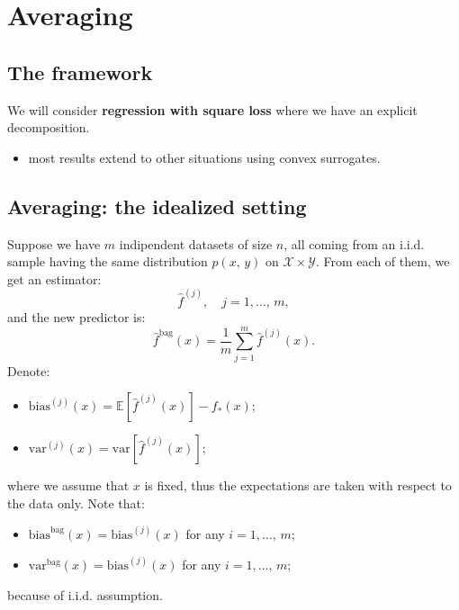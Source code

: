 \documentclass[
11pt,notheorems,hyperref={pdfauthor=whatever}
]{beamer}
\begin{document}
\section{Averaging}
\subsection{The framework}
\begin{frame}
    We will consider \alert{\textbf{regression with square loss}} where we have an explicit  decomposition.
    \begin{itemize}
        \item most results extend to other situations using convex surrogates.
    \end{itemize}
\end{frame}

\subsection{Averaging: the idealized setting}
\begin{frame}
    Suppose we have \(m\) indipendent datasets of size \(n\), all coming from an i.i.d. sample having the same distribution \(p(x,\,y)\) on \(\mathcal{X}\times\mathcal{Y}\). From each of them, we get an estimator:
    \[
        \hat{f}^{(j)},\quad j=1,\dots,\,m,
    \]
    and the new predictor is:
    \[
        \hat{f}^{\text{bag}}(x) = \frac{1}{m} \sum_{j=1}^m \hat{f}^{(j)}(x).
    \]
    Denote:
    \begin{itemize}
        \item \(\text{bias}^{(j)}(x)=\mathbb{E}\left[\hat{f}^{(j)}(x)\right]-f_*(x)\);
        \item \(\text{var}^{(j)}(x)=\text{var}\left[\hat{f}^{(j)}(x)\right]\);
    \end{itemize}
    where we assume that \(x\) is fixed, thus the expectations are taken with respect to the data only. Note that:
    \begin{itemize}
        \item \(\text{bias}^{\text{bag}}(x)=\text{bias}^{(j)}(x)\) for any \(i=1,\dots,\,m\);
        \item \(\text{var}^{\text{bag}}(x)=\text{bias}^{(j)}(x)\) for any \(i=1,\dots,\,m\);
    \end{itemize}
    because of i.i.d. assumption. 
\end{frame}
\end{document}
